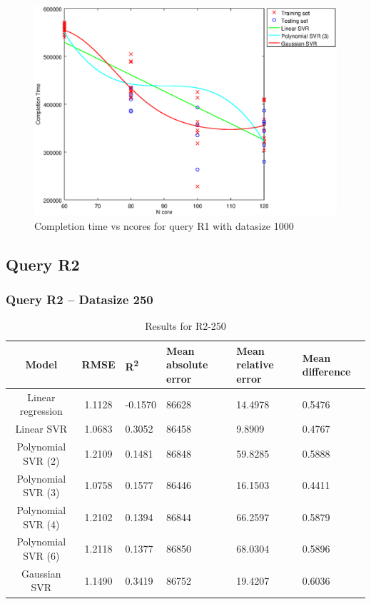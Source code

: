 \documentclass[a4paper,11pt]{article}
\begin{document}
\begin {figure}[hbtp]
\centering
\includegraphics[width=\textwidth]{output/R1_1000_ONLY_1_LINEAR_NCORE/plot_R1_1000_bestmodels.eps}
\caption{Completion time vs ncores for query R1 with datasize 1000}
\label{fig:coreonly_linear_R1_1000}
\end {figure}

\newpage
\subsection{Query R2}
\subsubsection{Query R2 -- Datasize 250}
\begin{table}[H]
	\centering
	\begin{adjustbox}{center}
		\begin{tabular}{c | c M{1.2cm} M{2.5cm} M{2.5cm} M{1.8cm}}
			Model & RMSE & R\textsuperscript{2} & Mean absolute error & Mean relative error & Mean difference \tabularnewline
			\hline
			Linear regression & 1.1128 & -0.1570 &  86628 & 14.4978 & 0.5476 \\
			Linear SVR & 1.0683 & 0.3052 &  86458 & 9.8909 & 0.4767 \\
			Polynomial SVR (2) & 1.2109 & 0.1481 &  86848 & 59.8285 & 0.5888 \\
			Polynomial SVR (3) & 1.0758 & 0.1577 &  86446 & 16.1503 & 0.4411 \\
			Polynomial SVR (4) & 1.2102 & 0.1394 &  86844 & 66.2597 & 0.5879 \\
			Polynomial SVR (6) & 1.2118 & 0.1377 &  86850 & 68.0304 & 0.5896 \\
			Gaussian SVR & 1.1490 & 0.3419 &  86752 & 19.4207 & 0.6036 \\
		\end{tabular}
	\end{adjustbox}
	\\
	\caption{Results for R2-250}
	\label{fig:coreonly_linear_R2_250}
\end{table}
\end{document}
